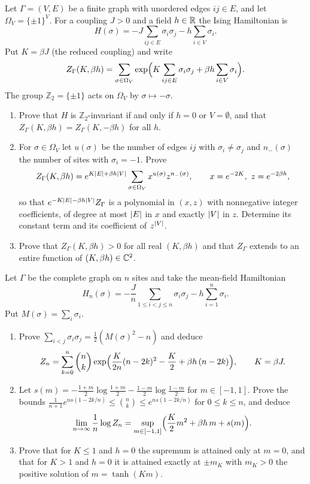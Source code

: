 \begin{exercise}
Let $\Gamma=(V,E)$ be a finite graph with unordered edges $ij\in E$, and let
$\Omega_V=\{\pm1\}^V$.  For a coupling $J>0$ and a field $h\in\mathbb R$ the Ising
Hamiltonian is
\[
 H(\sigma)=-J\sum_{ij\in E}\sigma_i\sigma_j-h\sum_{i\in V}\sigma_i .
\]
Put $K=\beta J$ (the reduced coupling) and write
\[
 Z_\Gamma(K,\beta h)=\sum_{\sigma\in\Omega_V}
 \exp\Bigl(K\sum_{ij\in E}\sigma_i\sigma_j+\beta h\sum_{i\in V}\sigma_i\Bigr).
\]
The group $\mathbb Z_2=\{\pm1\}$ acts on $\Omega_V$ by $\sigma\mapsto-\sigma$.
\begin{enumerate}[label=(\alph*)]
\item Prove that $H$ is $\mathbb Z_2$-invariant if and only if $h=0$ or
$V=\emptyset$, and that $Z_\Gamma(K,\beta h)=Z_\Gamma(K,-\beta h)$ for all
$h$.
\item For $\sigma\in\Omega_V$ let $u(\sigma)$ be the number of edges $ij$
with $\sigma_i\ne\sigma_j$ and $n_-(\sigma)$ the number of sites with
$\sigma_i=-1$.  Prove
\[
 Z_\Gamma(K,\beta h)=e^{K\left\lvert E\right\rvert+\beta h\left\lvert V\right\rvert}
 \sum_{\sigma\in\Omega_V}x^{u(\sigma)}z^{n_-(\sigma)},
 \qquad x=e^{-2K},\ z=e^{-2\beta h},
\]
so that $e^{-K\left\lvert E\right\rvert-\beta h\left\lvert V\right\rvert}Z_\Gamma$ is a polynomial in $(x,z)$ with
nonnegative integer coefficients, of degree at most $\left\lvert E\right\rvert$ in $x$ and
exactly $\left\lvert V\right\rvert$ in $z$.  Determine its constant term and its coefficient of
$z^{\left\lvert V\right\rvert}$.
\item Prove that $Z_\Gamma(K,\beta h)>0$ for all real $(K,\beta h)$ and that
$Z_\Gamma$ extends to an entire function of $(K,\beta h)\in\mathbb C^2$.
\end{enumerate}
\end{exercise}

\begin{exercise}
Let $\Gamma$ be the complete graph on $n$ sites and take the mean-field
Hamiltonian
\[
 H_n(\sigma)=-\frac{J}{n}\sum_{1\le i<j\le n}\sigma_i\sigma_j-h\sum_{i=1}^n\sigma_i .
\]
Put $M(\sigma)=\sum_i\sigma_i$.
\begin{enumerate}[label=(\alph*)]
\item Prove $\sum_{i<j}\sigma_i\sigma_j=\tfrac12(M(\sigma)^2-n)$ and deduce
\[
 Z_n=\sum_{k=0}^n\binom nk
 \exp\Bigl(\frac{K}{2n}(n-2k)^2-\frac K2+\beta h\,(n-2k)\Bigr),
 \qquad K=\beta J .
\]
\item Let $s(m)=-\frac{1+m}2\log\frac{1+m}2-\frac{1-m}2\log\frac{1-m}2$ for
$m\in[-1,1]$.  Prove the bounds
$\frac1{n+1}e^{ns(1-2k/n)}\le\binom nk\le e^{ns(1-2k/n)}$ for $0\le k\le n$,
and deduce
\[
 \lim_{n\to\infty}\frac1n\log Z_n
 =\sup_{m\in[-1,1]}\Bigl(\frac K2m^2+\beta h\,m+s(m)\Bigr).
\]
\item Prove that for $K\le1$ and $h=0$ the supremum is attained only at
$m=0$, and that for $K>1$ and $h=0$ it is attained exactly at $\pm m_K$ with
$m_K>0$ the positive solution of $m=\tanh(Km)$.
\end{enumerate}
\end{exercise}

